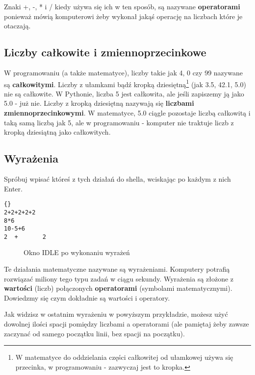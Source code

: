 \documentclass{book}
\begin{document}
Znaki +, -, * i / kiedy używa się ich w ten sposób, są nazywane {\bf operatorami} ponieważ mówią komputerowi żeby wykonał jakąś operację na liczbach które je otaczają.

\subsection{Liczby całkowite i zmiennoprzecinkowe}

W programowaniu (a także matematyce), liczby takie jak 4, 0 czy 99 nazywane są {\bf całkowitymi}. Liczby z ułamkami bądź kropką dziesiętną\footnote{W matematyce do oddzielania części całkowitej od ułamkowej używa się przecinka, w programowaniu - zazwyczaj jest to kropka.} (jak 3.5, 42.1, 5.0) nie są całkowite. W Pythonie, liczba 5 jest całkowita, ale jeśli zapiszemy ją jako 5.0 - już nie. Liczby z kropką dziesiętną nazywają się {\bf liczbami zmiennoprzecinkowymi}. W matematyce, 5.0 ciągle pozostaje liczbą całkowitą i taką samą liczbą jak 5, ale w programowaniu - komputer nie traktuje liczb z kropką dziesiątną jako całkowitych.

\subsection{Wyrażenia}

Spróbuj wpisać któreś z tych działań do shella, wciskając po każdym z nich Enter.

\lstset{language=python}
\begin{lstlisting}{}
2+2+2+2+2
8*6
10-5+6
2  +       2
\end{lstlisting}

\begin{figure}
\centerline{
}
\caption{Okno IDLE po wykonaniu wyrażeń}
\label{idle-dwaplusdwa}
\end{figure}

Te działania matematyczne nazywane są wyrażeniami. Komputery potrafią rozwiązać miliony tego typu zadań w ciągu sekundy. Wyrażenia są złożone z {\bf wartości} (liczb) połączonych {\bf operatorami} (symbolami matematycznymi). Dowiedzmy się czym dokładnie są wartości i operatory.

Jak widzisz w ostatnim wyrażeniu w powyższym przykładzie, możesz użyć dowolnej ilości spacji pomiędzy liczbami a operatorami (ale pamiętaj żeby zawsze zaczynać od samego początku linii, bez spacji na początku).
\end{document}
